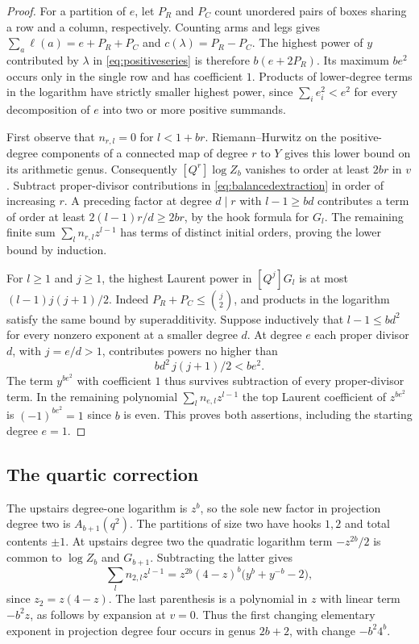 \begin{proof}
For a partition of $e$, let $P_R$ and $P_C$ count unordered pairs of
boxes sharing a row and a column, respectively. Counting arms and legs
gives $\sum_a\ell(a)=e+P_R+P_C$ and $c(\lambda)=P_R-P_C$. The
highest power of $y$ contributed by $\lambda$ in
\eqref{eq:positiveseries} is therefore $b(e+2P_R)$. Its maximum
$be^2$ occurs only in the single row and has coefficient $1$.
Products of lower-degree terms in the logarithm have strictly
smaller highest power, since $\sum_i e_i^2<e^2$ for every
decomposition of $e$ into two or more positive summands.

First observe that $n_{r,l}=0$ for $l<1+br$. Riemann--Hurwitz on
the positive-degree components of a connected map of degree $r$ to
$Y$ gives this lower bound on its arithmetic genus. Consequently
$[Q^r]\log Z_b$ vanishes to order at least $2br$ in $v$.
Subtract proper-divisor contributions in \eqref{eq:balancedextraction}
in order of increasing $r$. A preceding factor at degree $d\mid r$
with $l-1\ge bd$ contributes a term of order at least
$2(l-1)r/d\ge 2br$, by the hook formula for $G_l$. The remaining
finite sum $\sum_l n_{r,l}z^{l-1}$ has terms of distinct initial
orders, proving the lower bound by induction.

For $l\ge1$ and $j\ge1$, the highest Laurent power in
$[Q^j]G_l$ is at most $(l-1)j(j+1)/2$. Indeed
$P_R+P_C\le\binom j2$, and products in the logarithm satisfy the
same bound by superadditivity. Suppose inductively that $l-1\le bd^2$
for every nonzero exponent at a smaller degree $d$. At degree $e$
each proper divisor $d$, with $j=e/d>1$, contributes powers no higher
than
\[
 bd^2\,j(j+1)/2 < be^2.
\]
The term $y^{be^2}$ with coefficient $1$ thus survives subtraction
of every proper-divisor term. In the remaining polynomial
$\sum_l n_{e,l}z^{l-1}$ the top Laurent coefficient of $z^{be^2}$
is $(-1)^{be^2}=1$ since $b$ is even. This proves both assertions,
including the starting degree $e=1$.
\end{proof}

\subsection{The quartic correction}
The upstairs degree-one logarithm is $z^b$, so the sole new factor
in projection degree two is $A_{b+1}(q^2)$. The partitions of size
two have hooks $1,2$ and total contents $\pm1$. At upstairs degree
two the quadratic logarithm term $-z^{2b}/2$ is common to
$\log Z_b$ and $G_{b+1}$. Subtracting the latter gives
\begin{equation}\label{eq:quarticgenus}
 \sum_l n_{2,l} z^{l-1}
     = z^{2b}(4-z)^b\big(y^b+y^{-b}-2\big),
\end{equation}
since $z_2=z(4-z)$. The last parenthesis is a polynomial in $z$
with linear term $-b^2 z$, as follows by expansion at $v=0$.
Thus the first changing elementary exponent in projection degree
four occurs in genus $2b+2$, with change $-b^2 4^b$.

